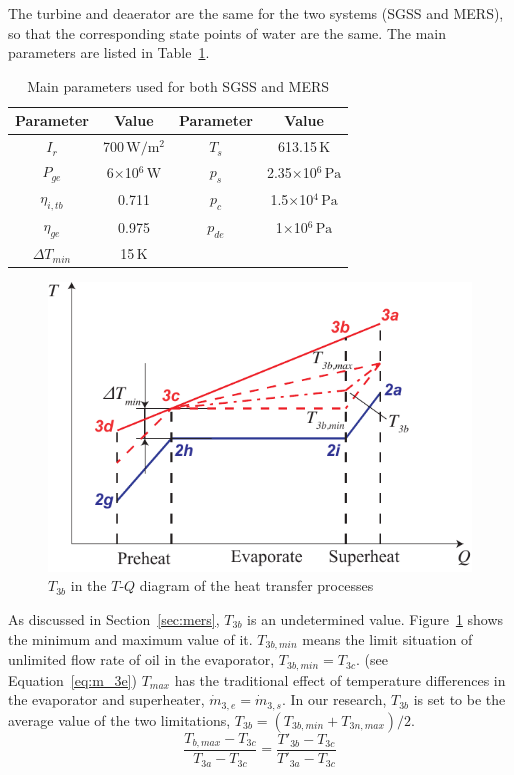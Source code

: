 The turbine and deaerator are the same for the two systems (SGSS and MERS), so that the corresponding state points of water are the same. The main parameters are listed in Table~\ref{tab:ptc}.
\begin{table}[htbp]
	\caption{Main parameters used for both SGSS and MERS}
	\begin{center}
	\begin{tabular}{cccc}
		\toprule
		Parameter		&	Value	&	Parameter		&	Value\\
		\midrule
		$I_r$	&	700$\,\mathrm{W/m^2}$	&	$T_s$		&	613.15$\,\mathrm{K}$\\
		$P_{ge}$	&	6$\times$10$^6\,\mathrm{W}$	&	$p_s$		&	2.35$\times$10$^6\,\mathrm{Pa}$\\
		$\eta_{i,tb}$	&	0.711	&	$p_c$		&	1.5$\times$10$^4\,\mathrm{Pa}$\\
		$\eta_{ge}$	&	0.975	&	$p_{de}$		&	1$\times$10$^6\,\mathrm{Pa}$\\
		$\Delta T_{min}$	&	15$\,\mathrm{K}$	&	&\\		
		\bottomrule
	\end{tabular}
	\end{center}
	\label{tab:ptc}
\end{table}
\noindent \begin{figure}[htbp]
\begin{center}
	\includegraphics[width = 0.7\columnwidth]{fig/T3b}
	\caption{$T_{3b}$ in the $T$-$Q$ diagram of the heat transfer processes}
	\label{fig:T3b}
\end{center}
\end{figure}

As discussed in Section~\ref{sec:mers}, $T_{3b}$ is an undetermined value. Figure~\ref{fig:T3b} shows the minimum and maximum value of it. $T_{3b,min}$ means the limit situation of unlimited flow rate of oil in the evaporator, $T_{3b,min} = T_{3c}$. (see Equation~\ref{eq:m_3e}) $T_{max}$ has the traditional effect of temperature differences in the evaporator and superheater, $\dot{m}_{3,e} = \dot{m}_{3,s}$. In our research, $T_{3b}$ is set to be the average value of the two limitations, $T_{3b} = (T_{3b,min} + T_{3n,max}) / 2$.
\begin{equation}
  \dfrac{T_{b,max}-T_{3c}}{T_{3a} - T_{3c}} = \dfrac{T'_{3b} - T_{3c}}{T'_{3a} - T_{3c}}
\end{equation}

